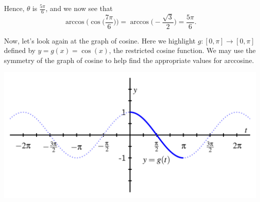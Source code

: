 \documentclass{ximera}
\begin{document}
\begin{example}
\begin{enumerate}
\begin{explanation}
\begin{image}
\end{image}
%
Hence, $\theta$ is $\frac{5\pi}{6}$, and we now see that 
\begin{equation*}
\arccos\Big(\cos\Big(\frac{7\pi}{6}\Big)\Big) = \arccos\Big(\!-\frac{\sqrt{3}}{2}\Big) = \frac{5\pi}{6}.
\end{equation*}

Now, let's look again at the graph of cosine. Here we highlight $g: [0,\pi] \rightarrow [0,\pi]$ defined by $y=g(x)=\cos(x)$, the restricted cosine function. We may use the symmetry of the graph of cosine to help find the appropriate values for arccosine.
\begin{image}
\includegraphics{inverse-trig-PA-cosine.png}
\end{image}





\end{explanation}
\end{enumerate}
\end{example}
\end{document}
